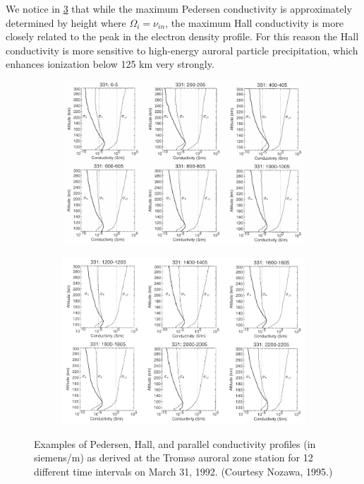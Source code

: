 We notice in \cref{fig:L14_three_currents} that while the maximum Pedersen conductivity is approximately determined by height where \(\Omega_i=\nu_{in}\), the maximum Hall conductivity is more closely related to the peak in the electron density profile. For this reason the Hall conductivity is more sensitive to high-energy auroral particle precipitation, which enhances ionization below 125 km very strongly.
\begin{figure}[t]
    \centering
    \begin{subfigure}[t]{.9\linewidth}
        \centering
        \includegraphics[width=.7\linewidth, angle=270]{bilder/L14_three_currents1.png}
        \caption{}\label{fig:L14_three_currents1}
    \end{subfigure}

    \begin{subfigure}[t]{.9\linewidth}
        \centering
        \includegraphics[width=.7\linewidth, angle=270]{bilder/L14_three_currents2.png}
        \caption{}\label{fig:L14_three_currents2}
    \end{subfigure}

    \caption{Examples of Pedersen, Hall, and parallel conductivity profiles (in siemens/m) as derived at the Tromsø auroral zone station for 12 different time intervals on March 31, 1992. (Courtesy Nozawa, 1995.)}\label{fig:L14_three_currents}
\end{figure}

